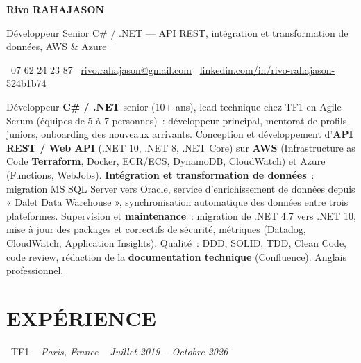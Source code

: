 \documentclass[10pt,a4paper]{article}
\begin{document}
\begin{center}
{\Huge \textbf{\color{ink}Rivo RAHAJASON}}

\vspace{4pt}

{\large \color{primary} Développeur Senior C\# / .NET --- API REST, intégration et transformation de données, AWS \& Azure}

\vspace{6pt}

\color{darkgray} \faPhone\  07 62 24 23 87 \quad
\color{darkgray} \faEnvelope\ \href{mailto:rivo.rahajason@gmail.com}{rivo.rahajason@gmail.com} \quad
\color{darkgray} \faLinkedin\ \href{https://linkedin.com/in/rivo-rahajason-524b1b74}{linkedin.com/in/rivo-rahajason-524b1b74}

\vspace{10pt}

\begin{minipage}{\textwidth}
\small\color{darkgray}
Développeur \textbf{C\# / .NET} senior (10+ ans), lead technique chez TF1 en Agile Scrum (équipes de 5 à 7 personnes)~: développeur principal, mentorat de profils juniors, onboarding des nouveaux arrivants. Conception et développement d'\textbf{API REST / Web API} (.NET 10, .NET 8, .NET Core) sur \textbf{AWS} (Infrastructure as Code \textbf{Terraform}, Docker, ECR/ECS, DynamoDB, CloudWatch) et Azure (Functions, WebJobs). \textbf{Intégration et transformation de données}~: migration MS SQL Server vers Oracle, service d'enrichissement de données depuis « Dalet Data Warehouse », synchronisation automatique des données entre trois plateformes. Supervision et \textbf{maintenance}~: migration de .NET 4.7 vers .NET 10, mise à jour des packages et correctifs de sécurité, métriques (Datadog, CloudWatch, Application Insights). Qualité~: DDD, SOLID, TDD, Clean Code, code review, rédaction de la \textbf{documentation technique} (Confluence). Anglais professionnel.
\end{minipage}

\vspace{16pt}
\end{center}

\section*{EXPÉRIENCE}

\noindent\textcolor{primary}{ \faBuilding\ TF1} \quad
\textit{ \small \textcolor{darkgray}{ \faMapMarker\ } Paris, France } \hfill
\textit{ \small \textcolor{darkgray}{ \faCalendar\ } Juillet 2019 -- Octobre 2026 }
\end{document}
